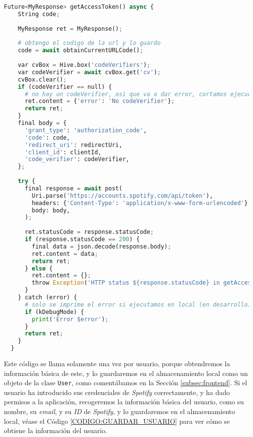 \begin{lstlisting}[language=python, caption=Obtener \texttt{access\_token} y \texttt{refresh\_token}, label=CODIGO:GET_ACCESS_TOKEN]
  Future<MyResponse> getAccessToken() async {
    String code;
  
    MyResponse ret = MyResponse();
  
    # obtengo el codigo de la url y lo guardo
    code = await obtainCurrentURLCode();
  
    var cvBox = Hive.box('codeVerifiers');
    var codeVerifier = await cvBox.get('cv');
    cvBox.clear();
    if (codeVerifier == null) {
      # no hay un codeVerifier, asi que va a dar error, cortamos ejecucion
      ret.content = {'error': 'No codeVerifier'};
      return ret;
    }
    final body = {
      'grant_type': 'authorization_code',
      'code': code,
      'redirect_uri': redirectUri,
      'client_id': clientId,
      'code_verifier': codeVerifier,
    };
  
    try {
      final response = await post(
        Uri.parse('https://accounts.spotify.com/api/token'),
        headers: {'Content-Type': 'application/x-www-form-urlencoded'},
        body: body,
      );
  
      ret.statusCode = response.statusCode;
      if (response.statusCode == 200) {
        final data = json.decode(response.body);
        ret.content = data;
        return ret;
      } else {
        ret.content = {};
        throw Exception('HTTP status ${response.statusCode} in getAccessToken');
      }
    } catch (error) {
      # solo se imprime el error si ejecutamos en local (en desarrollo)
      if (kDebugMode) {
        print('Error $error');
      }
      return ret;
    }
  }

\end{lstlisting}

Este código se llama solamente una vez por usuario, porque obtendremos la información básica de este, y lo guardaremos
en el almacenamiento local como un objeto de la clase \texttt{User}, como comentábamos en la Sección \ref{subsec:frontend}.
Si el usuario ha introducido sus credenciales de \textit{Spotify} correctamente, y ha dado permisos a la aplicación, recogeremos
la información básica del usuario, como su nombre, su \textit{email}, y su \textit{ID} de \textit{Spotify}, y lo guardaremos en 
el almacenamiento local, véase el Código \ref{CODIGO:GUARDAR_USUARIO} para ver cómo se obtiene la información del usuario.

